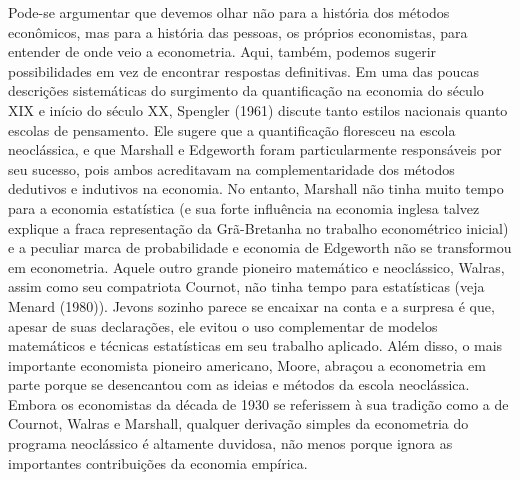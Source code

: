 \documentclass[12pt]{article}
\begin{document}
Pode-se argumentar que devemos olhar não para a história dos métodos econômicos, mas para a história das pessoas, os próprios economistas, para entender de onde veio a econometria. Aqui, também, podemos sugerir possibilidades em vez de encontrar respostas definitivas. Em uma das poucas descrições sistemáticas do surgimento da quantificação na economia do século XIX e início do século XX, Spengler (1961) discute tanto estilos nacionais quanto escolas de pensamento. Ele sugere que a quantificação floresceu na escola neoclássica, e que Marshall e Edgeworth foram particularmente responsáveis por seu sucesso, pois ambos acreditavam na complementaridade dos métodos dedutivos e indutivos na economia. No entanto, Marshall não tinha muito tempo para a economia estatística (e sua forte influência na economia inglesa talvez explique a fraca representação da Grã-Bretanha no trabalho econométrico inicial) e a peculiar marca de probabilidade e economia de Edgeworth não se transformou em econometria. Aquele outro grande pioneiro matemático e neoclássico, Walras, assim como seu compatriota Cournot, não tinha tempo para estatísticas (veja Menard (1980)). Jevons sozinho parece se encaixar na conta e a surpresa é que, apesar de suas declarações, ele evitou o uso complementar de modelos matemáticos e técnicas estatísticas em seu trabalho aplicado. Além disso, o mais importante economista pioneiro americano, Moore, abraçou a econometria em parte porque se desencantou com as ideias e métodos da escola neoclássica. Embora os economistas da década de 1930 se referissem à sua tradição como a de Cournot, Walras e Marshall, qualquer derivação simples da econometria do programa neoclássico é altamente duvidosa, não menos porque ignora as importantes contribuições da economia empírica.
\end{document}
